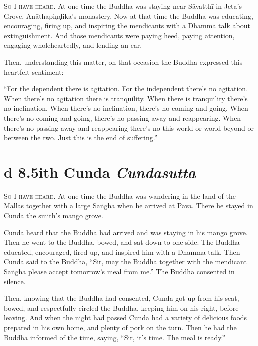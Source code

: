 \documentclass[12pt,openany]{book}%
\newcommand*{\suttatitleacronym}[1]{\smaller[2]{#1}\vspace*{.3em}}
\newcommand*{\suttatitletranslation}[1]{\linebreak{#1}}
\newcommand*{\suttatitleroot}[1]{\linebreak\smaller[2]\itshape{#1}}
\newcommand*{\tocacronym}[1]{\hspace*{-3.3em}{#1}\quad}
\newcommand*{\toctranslation}[1]{#1}
\newcommand*{\tocroot}[1]{(\textit{#1})}
\newcommand*{\scevam}[1]{\textsc{#1}}
\begin{document}
\scevam{So I have heard. }At one time the Buddha was staying near \textsanskrit{Sāvatthī} in Jeta’s Grove, \textsanskrit{Anāthapiṇḍika}’s monastery. Now at that time the Buddha was educating, encouraging, firing up, and inspiring the mendicants with a Dhamma talk about extinguishment. And those mendicants were paying heed, paying attention, engaging wholeheartedly, and lending an ear. 

Then, understanding this matter, on that occasion the Buddha expressed this heartfelt sentiment: 

“For the dependent there is agitation. For the independent there’s no agitation. When there’s no agitation there is tranquility. When there is tranquility there’s no inclination. When there’s no inclination, there’s no coming and going. When there’s no coming and going, there’s no passing away and reappearing. When there’s no passing away and reappearing there’s no this world or world beyond or between the two. Just this is the end of suffering.” 

%
\section*{{\suttatitleacronym Ud 8.5}{\suttatitletranslation With Cunda }{\suttatitleroot Cundasutta}}
\addcontentsline{toc}{section}{\tocacronym{Ud 8.5} \toctranslation{With Cunda } \tocroot{Cundasutta}}

\scevam{So I have heard. }At one time the Buddha was wandering in the land of the Mallas together with a large \textsanskrit{Saṅgha} when he arrived at \textsanskrit{Pāvā}. There he stayed in Cunda the smith’s mango grove. 

Cunda heard that the Buddha had arrived and was staying in his mango grove. Then he went to the Buddha, bowed, and sat down to one side. The Buddha educated, encouraged, fired up, and inspired him with a Dhamma talk. Then Cunda said to the Buddha, “Sir, may the Buddha together with the mendicant \textsanskrit{Saṅgha} please accept tomorrow’s meal from me.” The Buddha consented in silence. 

Then, knowing that the Buddha had consented, Cunda got up from his seat, bowed, and respectfully circled the Buddha, keeping him on his right, before leaving. And when the night had passed Cunda had a variety of delicious foods prepared in his own home, and plenty of pork on the turn. Then he had the Buddha informed of the time, saying, “Sir, it’s time. The meal is ready.” 
\end{document}
